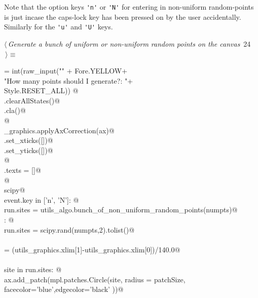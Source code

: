 \documentclass[11.5pt]{report}
\begin{document}
Note that the option keys \verb|'n'| or \verb|'N'| for entering in non-uniform random-points is just 
incase the caps-lock key has been pressed on by the user accidentally. Similarly for the \verb|'u'|
and \verb|'U'| keys.  

\begin{flushleft} \small\label{scrap27}\raggedright\small
{} $\langle\,${\itshape Generate a bunch of uniform or non-uniform random points on the canvas}\nobreak\ {\footnotesize {24}}$\,\rangle\equiv$
\vspace{-1ex}
\begin{list}{}{} \item
\mbox{}\verb@numpts = int(raw_input("\n" + Fore.YELLOW+\@\\
\mbox{}\verb@                       "How many points should I generate?: "+\@\\
\mbox{}\verb@                       Style.RESET_ALL)) @\\
\mbox{}\verb@run.clearAllStates()@\\
\mbox{}\verb@ax.cla()@\\
\mbox{}\verb@               @\\
\mbox{}\verb@utils_graphics.applyAxCorrection(ax)@\\
\mbox{}\verb@ax.set_xticks([])@\\
\mbox{}\verb@ax.set_yticks([])@\\
\mbox{}\verb@                @\\
\mbox{}\verb@fig.texts = []@\\
\mbox{}\verb@                 @\\
\mbox{}\verb@import scipy@\\
\mbox{}\verb@if event.key in ['n', 'N']: @\\
\mbox{}\verb@        run.sites = utils_algo.bunch_of_non_uniform_random_points(numpts)@\\
\mbox{}\verb@else : @\\
\mbox{}\verb@        run.sites = scipy.rand(numpts,2).tolist()@\\
\mbox{}\verb@@\\
\mbox{}\verb@patchSize  = (utils_graphics.xlim[1]-utils_graphics.xlim[0])/140.0@\\
\mbox{}\verb@@\\
\mbox{}\verb@for site in run.sites:      @\\
\mbox{}\verb@    ax.add_patch(mpl.patches.Circle(site, radius = patchSize, \@\\
\mbox{}\verb@                 facecolor='blue',edgecolor='black' ))@\\

\end{list}
\end{flushleft}
\end{document}
